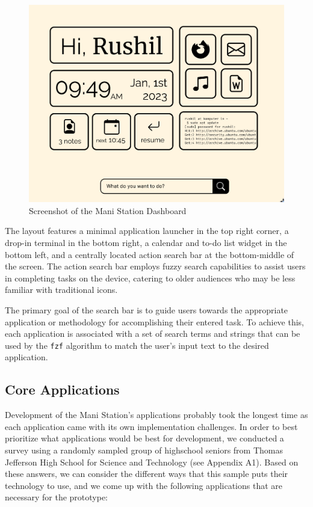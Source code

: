 \documentclass[letterpaper,twocolumn,10pt]{article}
\begin{document}
\begin{figure}[!h]
    \centering
    \includegraphics[scale=0.2]{res/dashboard.png}
    \caption{Screenshot of the Mani Station Dashboard}
\end{figure}

The layout features a minimal application launcher in the top right corner, a drop-in terminal in the bottom right, a calendar and to-do list widget in the bottom left, and a centrally located action search bar at the bottom-middle of the screen. The action search bar employs fuzzy search capabilities to assist users in completing tasks on the device, catering to older audiences who may be less familiar with traditional icons.

The primary goal of the search bar is to guide users towards the appropriate application or methodology for accomplishing their entered task. To achieve this, each application is associated with a set of search terms and strings that can be used by the \verb|fzf| algorithm to match the user's input text to the desired application.

\subsection{Core Applications}
Development of the Mani Station’s applications probably took the longest time as each application came with its own implementation challenges. In order to best prioritize what applications would be best for development, we conducted a survey using a randomly sampled group of highschool seniors from Thomas Jefferson High School for Science and Technology (see Appendix A1).
Based on these answers, we can consider the different ways that this sample puts their technology to use, and we come up with the following applications that are necessary for the prototype:
\end{document}
